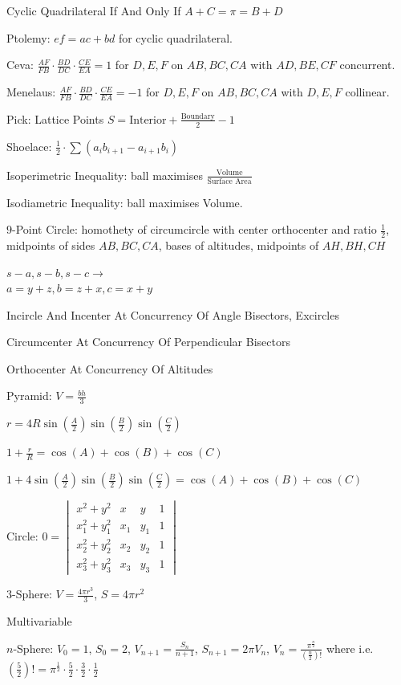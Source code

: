 Cyclic Quadrilateral If And Only If $A+C = \pi = B+D$

Ptolemy: $ef=ac+bd$ for cyclic quadrilateral.

Ceva: $\frac{AF}{FB} \cdot \frac{BD}{DC} \cdot \frac{CE}{EA} = 1$ for $D,E,F$ on $AB,BC,CA$ with $AD,BE,CF$ concurrent.

Menelaus: $\frac{AF}{FB} \cdot \frac{BD}{DC} \cdot \frac{CE}{EA} = -1$ for $D,E,F$ on $AB,BC,CA$ with $D,E,F$ collinear.

Pick: Lattice Points $S=\text{Interior}+\frac{\text{Boundary}}{2}-1$

Shoelace: $\frac{1}{2} \cdot \sum (a_i b_{i+1} - a_{i+1} b_i)$

Isoperimetric Inequality: ball maximises $\frac{\text{Volume}}{\text{Surface Area}}$

Isodiametric Inequality: ball maximises Volume.

$9$-Point Circle: homothety of circumcircle with center orthocenter and ratio $\frac{1}{2}$, midpoints of sides $AB,BC,CA$, bases of altitudes, midpoints of $AH,BH,CH$

$s-a,s-b,s-c \to$ \\
$a=y+z,b=z+x,c=x+y$

Incircle And Incenter At Concurrency Of Angle Bisectors, Excircles

Circumcenter At Concurrency Of Perpendicular Bisectors

Orthocenter At Concurrency Of Altitudes

Pyramid: $V=\frac{bh}{3}$

$r=4R \sin \left( \frac{A}{2} \right) \sin \left( \frac{B}{2} \right) \sin \left( \frac{C}{2} \right)$

$1+\frac{r}{R}=\cos(A)+\cos(B)+\cos(C)$

$1+4 \sin \left( \frac{A}{2} \right) \sin \left( \frac{B}{2} \right) \sin \left( \frac{C}{2} \right)=\cos(A)+\cos(B)+\cos(C)$

Circle:
$0 =
\begin{vmatrix}
x^2+y^2 & x & y & 1 \\
x_1^2+y_1^2 & x_1 & y_1 & 1 \\
x_2^2+y_2^2 & x_2 & y_2 & 1 \\
x_3^2+y_3^2 & x_3 & y_3 & 1
\end{vmatrix}
$

$3$-Sphere: $V=\frac{4\pi r^3}{3}$, $S=4\pi r^2$

Multivariable

$n$-Sphere: $V_0 = 1$, $S_0 = 2$, $V_{n+1} = \frac{S_n}{n+1}$, $S_{n+1}=2 \pi V_n$, $V_n = \frac{\pi^{\frac{n}{2}}}{\left(\frac{n}{2} \right)!}$ where i.e. $\left(\frac{5}{2} \right)!=\pi^{\frac{1}{2}} \cdot \frac{5}{2} \cdot \frac{3}{2} \cdot \frac{1}{2}$


